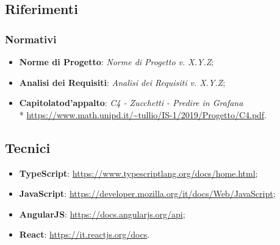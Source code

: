     \subsection{Riferimenti}
        \subsubsection{Normativi}
            \begin{itemize}
                \item \textbf{Norme di Progetto}: \textit{Norme di Progetto v. X.Y.Z};
                \item \textbf{Analisi dei Requisiti}: \textit{Analisi dei Requisiti v. X.Y.Z};
                \item \textbf{Capitolato}\glosp \textbf{d'appalto}: \textit{C4 - Zucchetti - Predire in Grafana}\glo \\*
                \url{https://www.math.unipd.it/~tullio/IS-1/2019/Progetto/C4.pdf}.
            \end{itemize}
        \subsection{Tecnici}
            \begin{itemize}
                \item \textbf{TypeScript}: \url{https://www.typescriptlang.org/docs/home.html};
                \item \textbf{JavaScript}: \url{https://developer.mozilla.org/it/docs/Web/JavaScript};
                \item \textbf{AngularJS}: \url{https://docs.angularjs.org/api};
                \item \textbf{React}: \url{https://it.reactjs.org/docs}.
            \end{itemize}